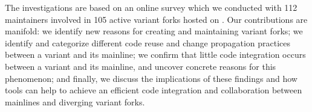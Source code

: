 The investigations are based on an online survey which we conducted with 112 maintainers involved in 105 active variant forks hosted on \gh.
%
Our contributions are manifold:
we identify new reasons for creating and maintaining variant forks;
we identify and categorize different code reuse and change propagation practices between a variant and its mainline;
we confirm that little code integration occurs between a variant and its mainline, and uncover concrete reasons for this phenomenon;
and finally, we discuss the implications of these findings and how tools can help to achieve an efficient code integration and collaboration between mainlines and diverging variant forks.



